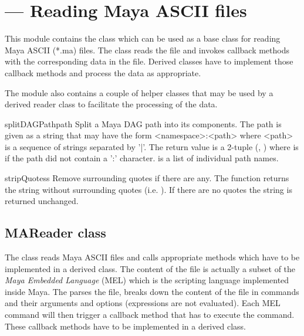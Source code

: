 \section{ ---
        Reading Maya ASCII files}


This module contains the  class which can be used as a
base class for reading Maya ASCII (*.ma) files. The class reads the file
and invokes callback methods with the corresponding data in the
file. Derived classes have to implement those callback methods and
process the data as appropriate.

The module also contains a couple of helper classes that may be
used by a derived reader class to facilitate the processing of the
data.

\begin{funcdesc}{splitDAGPath}{path}
Split a Maya DAG path into its components. The path is given as a
string that may have the form <namespace>:<path> where <path> is a
sequence of strings separated by '|'.  The return value is a 2-tuple
(, ) where  is  
if the path did not contain a ':' character.  is a list 
of individual path names.
\end{funcdesc}

\begin{funcdesc}{stripQuotes}{s}
Remove surrounding quotes if there are any. The function returns the
string  without surrounding quotes (i.e. ). 
If there are no quotes the string is returned unchanged.
\end{funcdesc}

\subsection{MAReader class}

The  class reads Maya ASCII files and calls
appropriate methods which have to be implemented in a derived class.
The content of the file is actually a subset of the {\em Maya Embedded
Language} (MEL) which is the scripting language implemented inside
Maya.  The  parses the file, breaks down the content
of the file in commands and their arguments and options (expressions
are not evaluated). Each MEL command will then trigger a callback
method that has to execute the command.  These callback methods have
to be implemented in a derived class.

